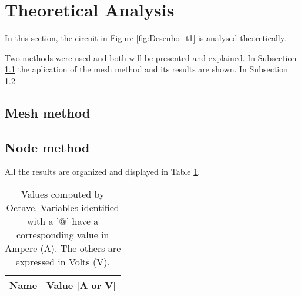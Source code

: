 \section{Theoretical Analysis}
\label{sec:analysis}



In this section, the circuit in Figure \ref{fig:Desenho_t1} is analysed theoretically.

Two methods were used and both will be presented and explained. In Subsection \ref{subsec:mesh_met}
the aplication of the mesh method and its results are shown. In Subsection \ref{subsec:node_met}



\subsection{Mesh method}
\label{subsec:mesh_met}






\subsection{Node method}
\label{subsec:node_met}


All the results are organized and displayed in Table \ref{tab:oct}.


\begin{table}[h]
	\centering
	\begin{tabular}{|l|r|}
    		\hline    
    		{\bf Name} & {\bf Value [A or V]} \\ \hline
    		
  	\end{tabular}
  	\caption{Values computed by Octave. Variables identified with a '$@$' have a
  	corresponding value in Ampere (A). The others are expressed in Volts (V).}
 
\label{tab:oct}
\end{table}



